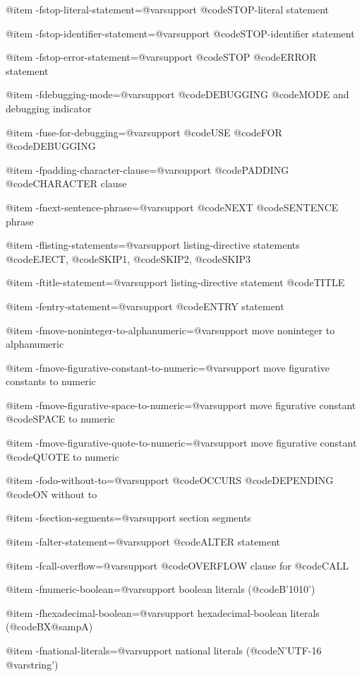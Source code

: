 @item -fstop-literal-statement=@var{support}
@code{STOP}-literal statement

@item -fstop-identifier-statement=@var{support}
@code{STOP}-identifier statement

@item -fstop-error-statement=@var{support}
@code{STOP} @code{ERROR} statement

@item -fdebugging-mode=@var{support}
@code{DEBUGGING} @code{MODE} and debugging indicator

@item -fuse-for-debugging=@var{support}
@code{USE} @code{FOR} @code{DEBUGGING}

@item -fpadding-character-clause=@var{support}
@code{PADDING} @code{CHARACTER} clause

@item -fnext-sentence-phrase=@var{support}
@code{NEXT} @code{SENTENCE} phrase

@item -flisting-statements=@var{support}
listing-directive statements @code{EJECT}, @code{SKIP1}, @code{SKIP2}, @code{SKIP3}

@item -ftitle-statement=@var{support}
listing-directive statement @code{TITLE}

@item -fentry-statement=@var{support}
@code{ENTRY} statement

@item -fmove-noninteger-to-alphanumeric=@var{support}
move noninteger to alphanumeric

@item -fmove-figurative-constant-to-numeric=@var{support}
move figurative constants to numeric

@item -fmove-figurative-space-to-numeric=@var{support}
move figurative constant @code{SPACE} to numeric

@item -fmove-figurative-quote-to-numeric=@var{support}
move figurative constant @code{QUOTE} to numeric

@item -fodo-without-to=@var{support}
@code{OCCURS} @code{DEPENDING} @code{ON} without to

@item -fsection-segments=@var{support}
section segments

@item -falter-statement=@var{support}
@code{ALTER} statement

@item -fcall-overflow=@var{support}
@code{OVERFLOW} clause for @code{CALL}

@item -fnumeric-boolean=@var{support}
boolean literals (@code{B'1010'})

@item -fhexadecimal-boolean=@var{support}
hexadecimal-boolean literals (@code{BX@samp{A}})

@item -fnational-literals=@var{support}
national literals (@code{N'UTF-16 @var{string}'})

